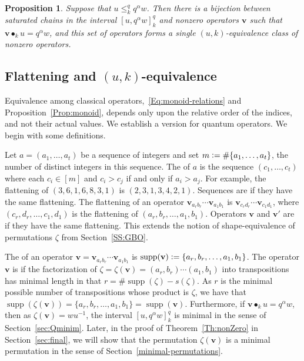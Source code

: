 \documentclass[11pt]{article}
\newtheorem{proposition}[theo]{Proposition}
\theoremstyle{definition}
\numberwithin{equation}{section}
\newcommand{\qv}{{\mathbf v}}
\DeclareMathOperator{\supp}{supp}
\DeclareMathOperator{\kactionop}{{\scriptstyle \bullet}}
\newcommand{\kaction}[1][k]{\kactionop_{#1}}
\newcommand{\defcolor}[1]{{\color{RoyalBlue}#1}}
\newcommand{\demph}[1]{\defcolor{{\sl #1}}}
\begin{document}
\begin{proposition}\label{Prop:chains_and_operators}
  Suppose that $u\leq_k^q q^\alpha w$.
  Then there is a bijection between saturated chains in the interval $[u,q^\alpha w]_k^q$ and nonzero operators $\qv$ 
  such that $\qv\kaction u=q^\alpha w$, and this set of operators forms a single $(u,k)$-equivalence class of nonzero operators.
\end{proposition}

\subsection{Flattening and \texorpdfstring{$(u,k)$}{(u,k)}-equivalence}
\label{SS:Shape-equivalence}

Equivalence among classical operators,~\eqref{Eq:monoid-relations} and
Proposition~\ref{Prop:monoid}, depends only upon the relative order of the indices, and not their actual values.
We establish a version for quantum operators.
We begin with some definitions.

Let $a=(a_1,\dotsc,a_t)$ be a sequence of integers and set $m\vcentcolon=\#\{a_1,\dotsc,a_t\}$, the number of distinct
integers in this sequence.
The \demph{flattening} of $a$ is the sequence $(c_1,\dotsc,c_t)$ where each $c_i\in[m]$ and $c_i>c_j$ if and only if $a_i>a_j$.
For example, the flattening of $(3,6,1,6,8,3,1)$ is $(2,3,1,3,4,2,1)$.
Sequences are \demph{shape-equivalent} if they have the same flattening.
The flattening of an operator $\qv_{a_r b_r}\dotsb\qv_{a_1 b_1}$ is  $\qv_{c_r d_r}\dotsb\qv_{c_1 d_1}$, where $(c_r,d_r,\dotsc,c_1,d_1)$  is
the flattening of $(a_r,b_r,\dotsc,a_1,b_1)$.
Operators $\qv$ and $\qv'$ are \demph{shape-equivalent} if they have the same flattening.
This extends the notion of shape-equivalence of permutations $\zeta$ from Section~\ref{SS:GBO}.

The \demph{support} of an operator $\qv=\qv_{a_r b_r}\dotsb\qv_{a_1 b_1}$ is $\supp(\qv)\vcentcolon=\{a_r,b_r,\dotsc,a_1,b_1\}$.
The operator $\qv$ is \demph{minimal} if the factorization of 
$\zeta=\zeta(\qv)=(a_r,b_r)\dotsb(a_1,b_1)$ into transpositions has minimal length in that
$r=\#\supp(\zeta)-s(\zeta)$.
As $r$ is the minimal possible number of transpositions whose product is $\zeta$, we have that
$\supp(\zeta(\qv))=\{a_r,b_r,\dotsc,a_1,b_1\}=\supp(\qv)$.
Furthermore, if $\qv\kaction u=q^\alpha w$, then as $\zeta(\qv)=wu^{-1}$, the interval $[u,q^\alpha w]_k^q$ is minimal in the
sense of Section~\ref{sec:Qminim}.
Later, in the proof of Theorem~\ref{Th:nonZero} in Section~\ref{sec:final}, we will show that the permutation $\zeta(\qv)$ is a
minimal permutation in the sense of Section~\ref{minimal-permutations}.
\end{document}
